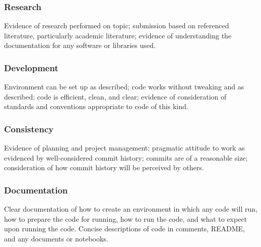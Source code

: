 \documentclass[a4paper, 12pt]{scrartcl}
\begin{document}
    \subsubsection*{Research}
    Evidence of research performed on topic; submission based on referenced literature, particularly academic literature; evidence of understanding the documentation for any software or libraries used.
    \subsubsection*{Development}
    Environment can be set up as described; code works without tweaking and as described; code is efficient, clean, and clear; evidence of consideration of standards and conventions appropriate to code of this kind.
    \subsubsection*{Consistency}
    Evidence of planning and project management; pragmatic attitude to work as evidenced by well-considered commit history; commits are of a reasonable size; consideration of how commit history will be perceived by others.
    \subsubsection*{Documentation}
    Clear documentation of how to create an environment in which any code will run, how to prepare the code for running, how to run the code, and what to expect upon running the code. Concise descriptions of code in comments, README, and any documents or notebooks.
    
  
  
\end{document}
